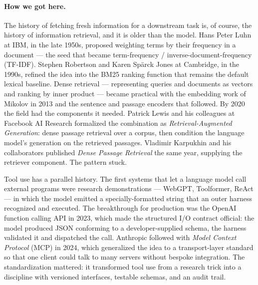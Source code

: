 \paragraph{How we got here.}
The history of fetching fresh information for a downstream task is,
of course, the history of information retrieval, and it is older than
the model. Hans Peter Luhn at IBM, in the late 1950s, proposed
weighting terms by their frequency in a document --- the seed that
became term-frequency / inverse-document-frequency (TF-IDF). Stephen
Robertson and Karen Sp\"arck Jones at Cambridge, in the 1990s,
refined the idea into the BM25 ranking function that remains the
default lexical baseline. Dense retrieval --- representing queries
and documents as vectors and ranking by inner product --- became
practical with the embedding work of Mikolov in 2013 and the
sentence and passage encoders that followed. By 2020 the field had
the components it needed. Patrick Lewis and his colleagues at
Facebook AI Research formalized the combination as
\emph{Retrieval-Augmented Generation}: dense passage retrieval over
a corpus, then condition the language model's generation on the
retrieved passages. Vladimir Karpukhin and his collaborators
published \emph{Dense Passage Retrieval} the same year, supplying
the retriever component. The pattern stuck.

Tool use has a parallel history. The first systems that let a
language model call external programs were research demonstrations
--- WebGPT, Toolformer, ReAct --- in which the model emitted a
specially-formatted string that an outer harness recognized and
executed. The breakthrough for production was the OpenAI function
calling API in 2023, which made the structured I/O contract
official: the model produced JSON conforming to a developer-supplied
schema, the harness validated it and dispatched the call. Anthropic
followed with \emph{Model Context Protocol} (MCP) in 2024, which
generalized the idea to a transport-layer standard so that one
client could talk to many servers without bespoke integration. The
standardization mattered: it transformed tool use from a research
trick into a discipline with versioned interfaces, testable
schemas, and an audit trail.

